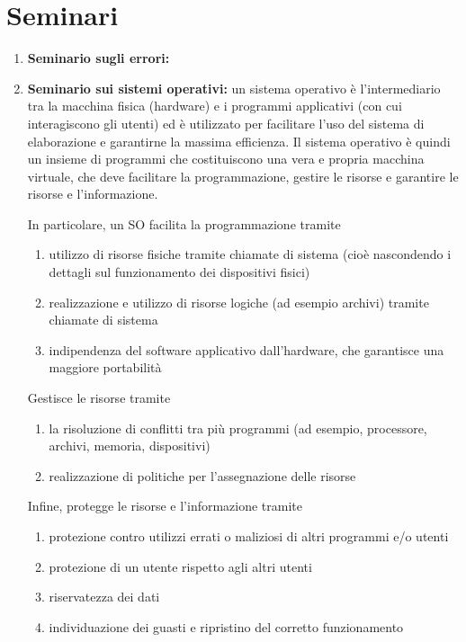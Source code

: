 \documentclass[a4paper,11pt]{article}
\begin{document}
\section{Seminari}
\begin{enumerate}[resume]
	\item\textbf{Seminario sugli errori:} 
	\item\textbf{Seminario sui sistemi operativi:} un sistema operativo è l'intermediario tra la macchina fisica (hardware) e i programmi applicativi (con cui interagiscono gli utenti) ed è utilizzato per facilitare l'uso del sistema di elaborazione e garantirne la massima efficienza. Il sistema operativo è quindi un insieme di programmi che costituiscono una vera e propria macchina virtuale, che deve facilitare la programmazione, gestire le risorse e garantire le risorse e l'informazione.
	
	\noindent In particolare, un SO facilita la programmazione tramite
	\begin{enumerate}
		\item utilizzo di risorse fisiche tramite chiamate di sistema (cioè nascondendo i dettagli sul funzionamento dei dispositivi fisici)
		\item realizzazione e utilizzo di risorse logiche (ad esempio archivi) tramite chiamate di sistema
		\item indipendenza del software applicativo dall'hardware, che garantisce una maggiore portabilità
	\end{enumerate}

	\noindent Gestisce le risorse tramite
	\begin{enumerate}
		\item la risoluzione di conflitti tra più programmi (ad esempio, processore, archivi, memoria, dispositivi)
		\item realizzazione di politiche per l'assegnazione delle risorse
	\end{enumerate} 

	\noindent Infine, protegge le risorse e l'informazione tramite
	\begin{enumerate}
		\item protezione contro utilizzi errati o maliziosi di altri programmi e/o utenti
		\item protezione di un utente rispetto agli altri utenti
		\item riservatezza dei dati
		\item individuazione dei guasti e ripristino del corretto funzionamento
	\end{enumerate}
	

\end{enumerate}
\end{document}
